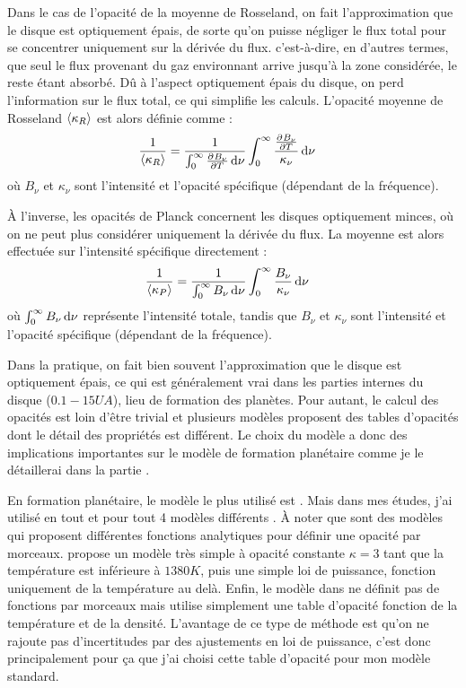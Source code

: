 Dans le cas de l'opacité de la moyenne de Rosseland, on fait l'approximation que le disque est optiquement épais, de sorte qu'on puisse négliger le flux total pour se concentrer uniquement sur la dérivée du flux. c'est-à-dire, en d'autres termes, que seul le flux provenant du gaz environnant arrive jusqu'à la zone considérée, le reste étant absorbé. Dû à l'aspect optiquement épais du disque, on perd l'information sur le flux total, ce qui simplifie les calculs. L'opacité moyenne de Rosseland $\left\langle \kappa_R\right\rangle$ est alors définie comme : 
\begin{align}
\inv{\moy{\kappa_R}} &= \inv{\int_0^\infty \pd{B_\nu}{T}\dif \nu} \int_0^\infty \frac{\pd{B_\nu}{T}}{\kappa_\nu}\dif \nu
\end{align}
où $B_\nu$ et $\kappa_\nu$ sont l'intensité et l'opacité spécifique (dépendant de la fréquence).

À l'inverse, les opacités de Planck concernent les disques optiquement minces, où on ne peut plus considérer uniquement la dérivée du flux. La moyenne est alors effectuée sur l'intensité spécifique directement : 
\begin{align}
\frac{1}{\left\langle \kappa_P\right\rangle} &= \frac{1}{\int_0^\infty B_\nu\operatorname{d \!} \nu} \int_0^\infty \frac{B_\nu}{\kappa_\nu}\operatorname{d \!} \nu
\end{align}
où $\int_0^\infty B_\nu\operatorname{d \!} \nu$ représente l'intensité totale, tandis que $B_\nu$ et $\kappa_\nu$ sont l'intensité et l'opacité spécifique (dépendant de la fréquence).

Dans la pratique, on fait bien souvent l'approximation que le disque est optiquement épais, ce qui est généralement vrai dans les parties internes du disque ($0.1-15\unit{UA}$), lieu de formation des planètes. Pour autant, le calcul des opacités est loin d'être trivial et plusieurs modèles proposent des tables d'opacités dont le détail des propriétés est différent. Le choix du modèle a donc des implications importantes sur le modèle de formation planétaire comme je le détaillerai dans la partie . 

En formation planétaire, le modèle le plus utilisé est \citep{bell1994FU}. Mais dans mes études, j'ai utilisé en tout et pour
tout 4 modèles différents \citep{bell1994FU, zhu2009nonsteady, chambers2009analytic, hure2000transition}. À noter que
\citep{bell1994FU, zhu2009nonsteady} sont des modèles qui proposent différentes fonctions analytiques pour définir une opacité
par morceaux. \citep{chambers2009analytic} propose un modèle très simple à opacité constante $\kappa=3$ tant que la température
est inférieure à $1380\unit{K}$, puis une simple loi de puissance, fonction uniquement de la température au delà. Enfin, le
modèle dans \citep{hure2000transition} ne définit pas de fonctions par morceaux mais utilise simplement une table d'opacité
fonction de la température et de la densité. L'avantage de ce type de méthode est qu'on ne rajoute pas d'incertitudes par des
ajustements en loi de puissance, c'est donc principalement pour ça que j'ai choisi cette table d'opacité pour mon modèle
standard. 

